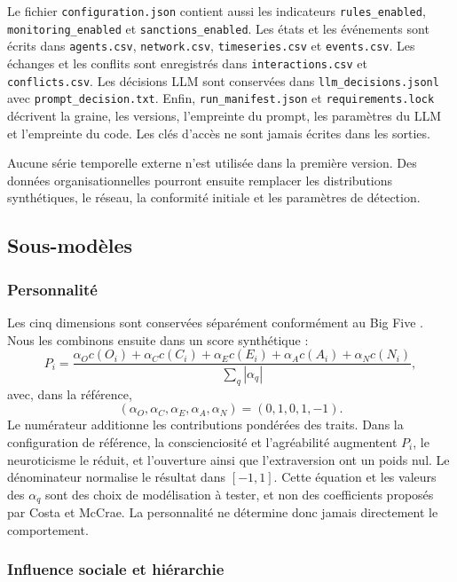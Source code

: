 \documentclass[10pt,a4paper]{article}
\newcommand{\code}[1]{\texttt{\small #1}}
\begin{document}
Le fichier \code{configuration.json} contient aussi les indicateurs
\code{rules\_enabled}, \code{monitoring\_enabled} et
\code{sanctions\_enabled}. Les états et les événements sont écrits dans
\code{agents.csv}, \code{network.csv}, \code{timeseries.csv} et
\code{events.csv}. Les échanges et les conflits sont enregistrés dans
\code{interactions.csv} et \code{conflicts.csv}. Les décisions LLM sont
conservées dans \code{llm\_decisions.jsonl} avec
\code{prompt\_decision.txt}. Enfin,
\code{run\_manifest.json} et \code{requirements.lock} décrivent la graine, les
versions, l’empreinte du prompt, les paramètres du LLM et l’empreinte du code.
Les clés d’accès ne sont jamais écrites dans les sorties.

Aucune série temporelle externe n’est utilisée dans la première version. Des
données organisationnelles pourront ensuite remplacer les distributions
synthétiques, le réseau, la conformité initiale et les paramètres de détection.

\subsection{Sous-modèles}

\subsubsection{Personnalité}

Les cinq dimensions sont conservées séparément conformément au Big Five
\cite{costa1992}. Nous les combinons ensuite dans un score synthétique :
\[
P_i=
\frac{\alpha_Oc(O_i)+\alpha_Cc(C_i)+\alpha_Ec(E_i)
+\alpha_Ac(A_i)+\alpha_Nc(N_i)}
{\sum_q|\alpha_q|},
\]
avec, dans la référence,
\[
(\alpha_O,\alpha_C,\alpha_E,\alpha_A,\alpha_N)=(0,1,0,1,-1).
\]
Le numérateur additionne les contributions pondérées des traits. Dans la
configuration de référence, la conscienciosité et l’agréabilité augmentent
$P_i$, le neuroticisme le réduit, et l’ouverture ainsi que l’extraversion ont
un poids nul. Le dénominateur normalise le résultat dans $[-1,1]$. Cette
équation et les valeurs des $\alpha_q$ sont des choix de modélisation à tester,
et non des coefficients proposés par Costa et McCrae. La personnalité ne
détermine donc jamais directement le comportement.

\subsubsection{Influence sociale et hiérarchie}
\end{document}
